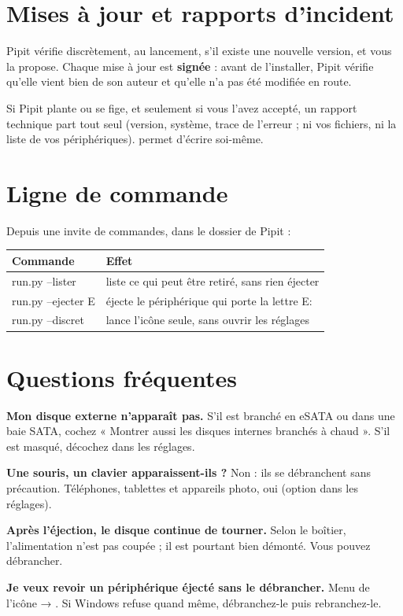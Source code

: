 \section{Mises à jour et rapports d'incident}

Pipit vérifie discrètement, au lancement, s'il existe une nouvelle version, et vous la
propose. Chaque mise à jour est \textbf{signée} : avant de l'installer, Pipit vérifie
qu'elle vient bien de son auteur et qu'elle n'a pas été modifiée en route.

Si Pipit plante ou se fige, et seulement si vous l'avez accepté, un rapport technique
part tout seul (version, système, trace de l'erreur ; ni vos fichiers, ni la liste de vos
périphériques).  permet d'écrire soi-même.

\section{Ligne de commande}

Depuis une invite de commandes, dans le dossier de Pipit :

\begin{center}
\begin{tabularx}{\linewidth}{>{\ttfamily\small}l X}
\toprule
\textrm{\textbf{Commande}} & \textbf{Effet} \\
\midrule
run.py --lister & liste ce qui peut être retiré, sans rien éjecter \\
run.py --ejecter E & éjecte le périphérique qui porte la lettre E: \\
run.py --discret & lance l'icône seule, sans ouvrir les réglages \\
\bottomrule
\end{tabularx}
\end{center}

\section{Questions fréquentes}

\textbf{Mon disque externe n'apparaît pas.} S'il est branché en eSATA ou dans une baie
SATA, cochez « Montrer aussi les disques internes branchés à chaud ». S'il est masqué,
décochez  dans les réglages.

\textbf{Une souris, un clavier apparaissent-ils ?} Non : ils se débranchent sans précaution.
Téléphones, tablettes et appareils photo, oui (option dans les réglages).

\textbf{Après l'éjection, le disque continue de tourner.} Selon le boîtier, l'alimentation
n'est pas coupée ; il est pourtant bien démonté. Vous pouvez débrancher.

\textbf{Je veux revoir un périphérique éjecté sans le débrancher.} Menu de l'icône →
. Si Windows refuse quand même, débranchez-le puis rebranchez-le.


